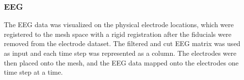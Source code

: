 \subsubsection{EEG}

The EEG data was visualized on the physical electrode locations, which were registered to the mesh space with a rigid registration after the fiducials were removed from the electrode dataset. The filtered and cut EEG matrix was used as input and each time step was represented as a column. The electrodes were then placed onto the mesh, and the EEG data mapped onto the electrodes one time step at a time. 